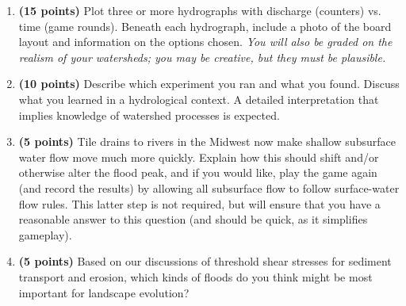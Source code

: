 \documentclass[letterpaper,10pt]{amsart}
\begin{document}
\begin{enumerate}
 \item \textbf{(15 points)} Plot three or more hydrographs with discharge (counters) vs. time (game rounds). Beneath each hydrograph, include a photo of the board layout and information on the options chosen. \textit{You will also be graded on the realism of your watersheds; you may be creative, but they must be plausible.}
 \item \textbf{(10 points)} Describe which experiment you ran and what you found. Discuss what you learned in a hydrological context. A detailed interpretation that implies knowledge of watershed processes is expected.
 \item \textbf{(5 points)} Tile drains to rivers in the Midwest now make shallow subsurface water flow move much more quickly. Explain how this should shift and/or otherwise alter the flood peak, and if you would like, play the game again (and record the results) by allowing all subsurface flow to follow surface-water flow rules. This latter step is not required, but will ensure that you have a reasonable answer to this question (and should be quick, as it simplifies gameplay).
 \item \textbf{(5 points)} Based on our discussions of threshold shear stresses for sediment transport and erosion, which kinds of floods do you think might be most important for landscape evolution?
\end{enumerate}
\end{document}
